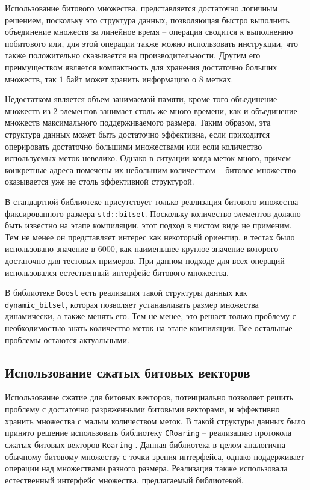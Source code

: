 Использование битового множества, представляется достаточно логичным решением, поскольку это структура данных, позволяющая быстро выполнить объединение множеств за линейное время -- операция сводится к выполнению побитового или, для этой операции также можно использовать  инструкции, что также положительно сказывается на производительности. Другим его преимуществом является компактность для хранения достаточно больших множеств, так $1$ байт может хранить информацию о $8$ метках.

Недостатком является объем занимаемой памяти, кроме того объединение множеств из $2$ элементов занимает столь же много времени, как и объединение множеств максимального поддерживаемого размера. Таким образом, эта структура данных может быть достаточно эффективна, если приходится оперировать достаточно большими множествами или если количество используемых меток невелико. Однако в ситуации когда меток много, причем конкретные адреса помечены их небольшим количеством -- битовое множество оказывается уже не столь эффективной структурой.

В стандартной библиотеке присутствует только реализация битового множества фиксированного размера \texttt{std::bitset}. Поскольку количество элементов должно быть известно на этапе компиляции, этот подход в чистом виде не применим. Тем не менее он представляет интерес как некоторый ориентир, в тестах было использовано значение в $6000$, как наименьшее круглое значение которого достаточно для тестовых примеров.
При данном подходе для всех операций использовался естественный интерфейс битового множества.

В библиотеке \texttt{Boost} есть реализация такой структуры данных как \texttt{dynamic\_bitset}, которая позволяет устанавливать размер множества динамически, а также менять его. Тем не менее, это решает только проблему с необходимостью знать количество меток на этапе компиляции. Все остальные проблемы остаются актуальными.

\subsection{Использование сжатых битовых векторов}

Использование сжатие для битовых векторов, потенциально позволяет решить проблему с достаточно разряженными битовыми векторами, и эффективно хранить множества с малым количеством меток.
В такой структуры данных было принято решение использовать библиотеку \texttt{CRoaring} -- реализацию протокола сжатых битовых векторов \texttt{Roaring} \cite{Roaring}. Данная библиотека в целом аналогична обычному битовому множеству с точки зрения интерфейса, однако поддерживает операции над множествами разного размера. Реализация также использовала естественный интерфейс множества, предлагаемый библиотекой.


